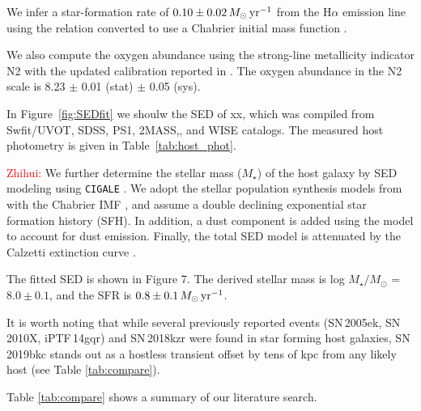 \documentclass[twocolumn]{aastex63}
\begin{document}
\begin{CJK*}{UTF8}{gbsn}
We infer a star-formation rate of $0.10 \pm 0.02 \, M_\odot\, {\rm yr^{-1}}$ from the H$\alpha$ 
emission line using the \citet{Kennicutt1998} relation converted to use a Chabrier initial mass function 
\citep{Chabrier2003, Madau2014}. 

We also compute the oxygen abundance using the strong-line metallicity indicator N2 
\citep{Pettini2004} with the updated calibration reported in \citet{Marino2013}. The oxygen abundance 
in the N2 scale is 8.23 $\pm$ 0.01 (stat) $\pm$ 0.05 (sys).

In Figure~\ref{fig:SEDfit} we shoulw the SED of xx, which was compiled from Swfit/UVOT, SDSS, PS1, 
2MASS,, and WISE catalogs. The measured host photometry is 
given in Table~\ref{tab:host_phot}.

\textcolor{red}{Zhihui:} 
We further determine the stellar mass ($M_{\star}$) of the host galaxy by SED modeling using 
\texttt{CIGALE} \citep{CIGALE19}. We adopt the stellar population synthesis models from \citet{BC03} 
with the Chabrier IMF \citep{Chabrier2003}, and assume a double declining  exponential star formation 
history (SFH). In addition, a dust component is added using the \citet{DL07} model to account for dust 
emission. Finally, the total SED model is attenuated by the Calzetti extinction curve \citep{Calzetti2000}.

The fitted SED is shown in Figure 7. The derived stellar mass is log $M_{\star}/M_{\odot}$ = 
$8.0 \pm 0.1$, and the SFR is $0.8 \pm0.1\, M_\odot\, {\rm yr^{-1}}$.

It is worth noting that while several 
previously reported events (SN\,2005ek, SN\,2010X, iPTF\,14gqr) and SN\,2018kzr were found in star 
forming host galaxies, SN\,2019bkc stands out as a hostless transient offset by tens of kpc from any 
likely host (see Table \ref{tab:compare}). 

Table \ref{tab:compare} shows a summary of our literature search.


\end{CJK*}
\end{document}
